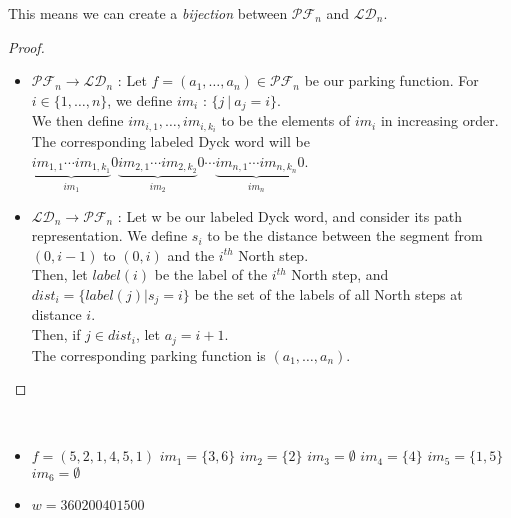 \begin{prop}
    This means we can create a \emph{bijection} between
    $\mathcal{PF}_n$ and $\mathcal{LD}_n$.
\end{prop}

\begin{proof}
    ~\
    \begin{itemize}
        \item $\mathcal{PF}_n \to \mathcal{LD}_n$ :
        Let $f = (a_1, \ldots, a_n) \in \mathcal{PF}_n$
        be our parking function. For $i \in \{1, \ldots,
        n\}$, we define $im_i$ : $\{j\ |\ a_j = i\}$. \\
        We then define $im_{i,1}, \ldots, im_{i,k_i}$ to be
        the elements of $im_i$ in increasing order.\\
        The corresponding labeled Dyck word will be \\
        $\underbrace{im_{1,1} \cdots im_{1,k_1}}_{im_1}0
         \underbrace{im_{2,1} \cdots im_{2,k_2}}_{im_2}0
         \cdots
         \underbrace{im_{n,1} \cdots im_{n,k_n}}_{im_n}0$.

        \item $\mathcal{LD}_n \to \mathcal{PF}_n$ :
        Let w be our labeled Dyck word, and consider its
        path representation. We define $s_i$ to be the
        distance between the segment from $(0, i-1)$ to
        $(0,i)$ and the $i^{th}$ North step.\\
        Then, let $label(i)$ be the label of the $i^{th}$
        North step, and $dist_i = \{label(j) | s_j = i\}$
        be the set of the labels of all North steps at
        distance $i$.\\
        Then, if $j \in dist_i$, let $a_j = i + 1$.\\
        The corresponding parking function is
        $(a_1, \ldots, a_n)$.
    \end{itemize}
\end{proof}

\begin{example}[$n = 6, \mathcal{PF}_n \to \mathcal{LD}_n$]
    ~\
    \begin{itemize}
        \item $f = (5, 2, 1, 4, 5, 1)$
            \subitem $im_1 = \{3, 6\}$
            \hspace{16mm} $im_2 = \{2\}$
            \hspace{24mm} $im_3 = \emptyset$
            \subitem $im_4 = \{4\}$
            \hspace{2cm} $im_5 = \{1, 5\}$
            \hspace{2cm} $im_6 = \emptyset$
        \item $w = 360200401500$
    \end{itemize}
    
\end{example}

